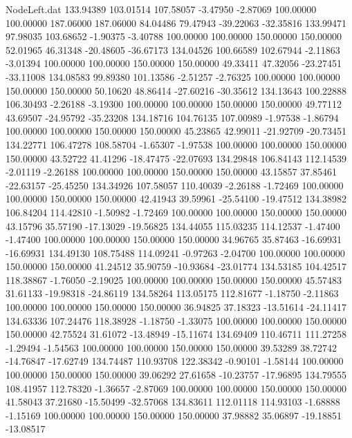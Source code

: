 \begin{filecontents}{NodeLeft.dat}
 133.94389  103.01514  107.58057    -3.47950   -2.87069  100.00000  100.00000  187.06000  187.06000   84.04486   79.47943  -39.22063  -32.35816
 133.99471   97.98035  103.68652    -1.90375   -3.40788  100.00000  100.00000  150.00000  150.00000   52.01965   46.31348  -20.48605  -36.67173
 134.04526  100.66589  102.67944    -2.11863   -3.01394  100.00000  100.00000  150.00000  150.00000   49.33411   47.32056  -23.27451  -33.11008
 134.08583   99.89380  101.13586    -2.51257   -2.76325  100.00000  100.00000  150.00000  150.00000   50.10620   48.86414  -27.60216  -30.35612
 134.13643  100.22888  106.30493    -2.26188   -3.19300  100.00000  100.00000  150.00000  150.00000   49.77112   43.69507  -24.95792  -35.23208
 134.18716  104.76135  107.00989    -1.97538   -1.86794  100.00000  100.00000  150.00000  150.00000   45.23865   42.99011  -21.92709  -20.73451
 134.22771  106.47278  108.58704    -1.65307   -1.97538  100.00000  100.00000  150.00000  150.00000   43.52722   41.41296  -18.47475  -22.07693
 134.29848  106.84143  112.14539    -2.01119   -2.26188  100.00000  100.00000  150.00000  150.00000   43.15857   37.85461  -22.63157  -25.45250
 134.34926  107.58057  110.40039    -2.26188   -1.72469  100.00000  100.00000  150.00000  150.00000   42.41943   39.59961  -25.54100  -19.47512
 134.38982  106.84204  114.42810    -1.50982   -1.72469  100.00000  100.00000  150.00000  150.00000   43.15796   35.57190  -17.13029  -19.56825
 134.44055  115.03235  114.12537    -1.47400   -1.47400  100.00000  100.00000  150.00000  150.00000   34.96765   35.87463  -16.69931  -16.69931
 134.49130  108.75488  114.09241    -0.97263   -2.04700  100.00000  100.00000  150.00000  150.00000   41.24512   35.90759  -10.93684  -23.01774
 134.53185  104.42517  118.38867    -1.76050   -2.19025  100.00000  100.00000  150.00000  150.00000   45.57483   31.61133  -19.98318  -24.86119
 134.58264  113.05175  112.81677    -1.18750   -2.11863  100.00000  100.00000  150.00000  150.00000   36.94825   37.18323  -13.51614  -24.11417
 134.63336  107.24476  118.38928    -1.18750   -1.33075  100.00000  100.00000  150.00000  150.00000   42.75524   31.61072  -13.48949  -15.11674
 134.69409  110.46711  111.27258    -1.29494   -1.54563  100.00000  100.00000  150.00000  150.00000   39.53289   38.72742  -14.76847  -17.62749
 134.74487  110.93708  122.38342    -0.90101   -1.58144  100.00000  100.00000  150.00000  150.00000   39.06292   27.61658  -10.23757  -17.96895
 134.79555  108.41957  112.78320    -1.36657   -2.87069  100.00000  100.00000  150.00000  150.00000   41.58043   37.21680  -15.50499  -32.57068
 134.83611  112.01118  114.93103    -1.68888   -1.15169  100.00000  100.00000  150.00000  150.00000   37.98882   35.06897  -19.18851  -13.08517

\end{filecontents}
